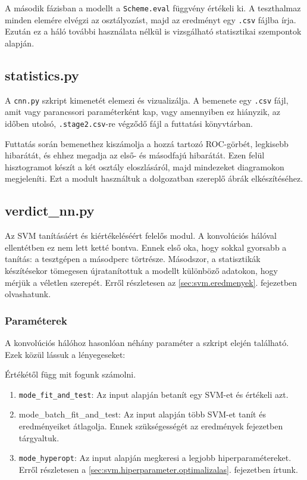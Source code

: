 A második fázisban a modellt a \texttt{Scheme.eval} függvény értékeli ki. A teszthalmaz 
minden elemére elvégzi az osztályozást, majd az eredményt egy \texttt{.csv} fájlba írja.
Ezután ez a háló további használata nélkül is vizsgálható statisztikai szempontok alapján.


\subsection{statistics.py}

A \texttt{cnn.py} szkript kimenetét elemezi és vizualizálja. A bemenete egy \texttt{.csv} 
fájl, amit vagy parancssori paraméterként kap, vagy amennyiben ez hiányzik, az időben utolsó,
\texttt{.stage2.csv}-re végződő fájl a futtatási könyvtárban.


Futtatás során bemenethez kiszámolja a hozzá tartozó ROC-görbét, legkisebb hibarátát,
és ehhez megadja az első- és másodfajú hibarátát. Ezen felül hisztogramot készít a 
két osztály eloszlásáról, majd mindezeket diagramokon megjeleníti. Ezt a modult használtuk
a dolgozatban szereplő ábrák elkészítéséhez.


\subsection{verdict\_nn.py}

Az SVM tanításáért és kiértékeléséért felelős modul. A konvolúciós hálóval ellentétben
ez nem lett ketté bontva. Ennek első oka, hogy sokkal gyorsabb a tanítás: a tesztgépen 
a másodperc törtrésze. Másodszor, a statisztikák készítésekor tömegesen újratanítottuk a 
modellt különböző adatokon, hogy mérjük a véletlen szerepét. Erről részletesen 
az \ref{sec:svm.eredmenyek}. fejezetben olvashatunk.

\subsubsection{Paraméterek}

A konvolúciós hálóhoz hasonlóan néhány paraméter a szkript elején található. Ezek közül
lássuk a lényegeseket:


Értékétől függ mit fogunk számolni.
\begin{enumerate}
\item 
	\texttt{mode\_fit\_and\_test}: Az input alapján betanít egy SVM-et és értékeli azt.
\item
	 mode\_batch\_fit\_and\_test: Az input alapján több SVM-et tanít és eredményeiket átlagolja.
	 Ennek szükségességét az eredmények fejezetben tárgyaltuk.
\item 
	\texttt{mode\_hyperopt}: Az input alapján megkeresi a legjobb hiperparamétereket. 
	Erről részletesen a \ref{sec:svm.hiperparameter.optimalizalas}. fejezetben írtunk.
\end{enumerate}


